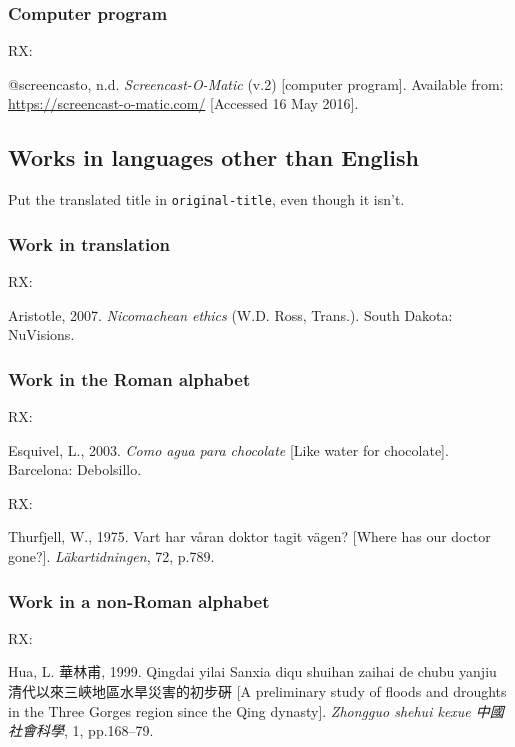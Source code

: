 \subsubsection*{Computer program}

RX: \cite{screencasto}

@screencasto, n.d. \emph{Screencast-O-Matic} (v.2) [computer program]. Available from: \url{https://screencast-o-matic.com/} [Accessed 16 May 2016].



\subsection{Works in languages other than English}

Put the translated title in \texttt{original-title}, even though it isn't.

\subsubsection*{Work in translation}

RX: \cite{aristotle2007ne}

Aristotle, 2007. \emph{Nicomachean ethics} (W.D. Ross, Trans.). South Dakota: NuVisions.



\subsubsection*{Work in the Roman alphabet}

RX: \cite{esquivel2003cap}

Esquivel, L., 2003. \emph{Como agua para chocolate} [Like water for chocolate]. Barcelona: Debolsillo.



RX: \cite{thurfjell1975vhv}

Thurfjell, W., 1975. Vart har våran doktor tagit vägen? [Where has our doctor gone?]. \emph{Läkartidningen}, 72, p.789.



\subsubsection*{Work in a non-Roman alphabet}

RX: \cite{hua1999qys1}

Hua, L. 華林甫, 1999. Qingdai yilai Sanxia diqu shuihan zaihai de chubu yanjiu 清代以來三峽地區水旱災害的初步硏 [A preliminary study of floods and droughts in the Three Gorges region since the Qing dynasty]. \emph{Zhongguo shehui kexue \textrm{中國社會科學}}, 1, pp.168--79.


